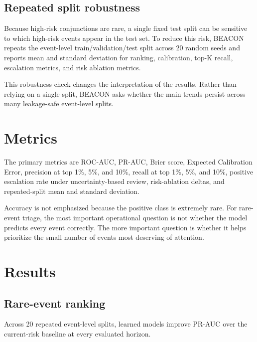 \documentclass[11pt]{article}
\begin{document}
\subsection{Repeated split robustness}

Because high-risk conjunctions are rare, a single fixed test split can be sensitive to which high-risk events appear in the test set. To reduce this risk, BEACON repeats the event-level train/validation/test split across 20 random seeds and reports mean and standard deviation for ranking, calibration, top-K recall, escalation metrics, and risk ablation metrics.

This robustness check changes the interpretation of the results. Rather than relying on a single split, BEACON asks whether the main trends persist across many leakage-safe event-level splits.

\section{Metrics}

The primary metrics are ROC-AUC, PR-AUC, Brier score, Expected Calibration Error, precision at top 1\%, 5\%, and 10\%, recall at top 1\%, 5\%, and 10\%, positive escalation rate under uncertainty-based review, risk-ablation deltas, and repeated-split mean and standard deviation.

Accuracy is not emphasized because the positive class is extremely rare. For rare-event triage, the most important operational question is not whether the model predicts every event correctly. The more important question is whether it helps prioritize the small number of events most deserving of attention.

\section{Results}

\subsection{Rare-event ranking}

Across 20 repeated event-level splits, learned models improve PR-AUC over the current-risk baseline at every evaluated horizon.
\end{document}
